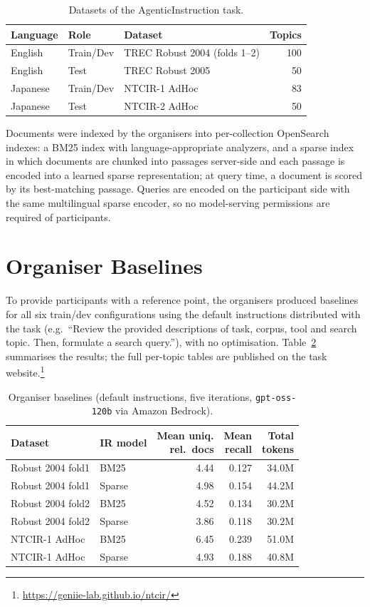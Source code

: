 \documentclass[sigconf,article]{acmart}
\begin{document}
\begin{table}
\caption{Datasets of the AgenticInstruction task.}
\label{tab:datasets}
\begin{tabular}{@{}lllr@{}}
\toprule
Language & Role & Dataset & Topics \\
\midrule
English & Train/Dev & TREC Robust 2004 (folds 1--2) & 100 \\
English & Test & TREC Robust 2005 & 50 \\
Japanese & Train/Dev & NTCIR-1 AdHoc & 83 \\
Japanese & Test & NTCIR-2 AdHoc & 50 \\
\bottomrule
\end{tabular}
\end{table}

Documents were indexed by the organisers into per-collection OpenSearch
indexes: a BM25 index with language-appropriate analyzers, and a sparse
index in which documents are chunked into passages server-side and each
passage is encoded into a learned sparse representation; at query time, a
document is scored by its best-matching passage. Queries are encoded on the
participant side with the same multilingual sparse encoder, so no
model-serving permissions are required of participants.

\section{Organiser Baselines}
\label{sec:baselines}

To provide participants with a reference point, the organisers produced
baselines for all six train/dev configurations using the default
instructions distributed with the task (e.g.\ ``Review the provided
descriptions of task, corpus, tool and search topic. Then, formulate a search
query.''), with no optimisation. Table~\ref{tab:baselines} summarises the
results; the full per-topic tables are published on the task
website.\footnote{\url{https://geniie-lab.github.io/ntcir/}}

\begin{table}
\caption{Organiser baselines (default instructions, five iterations,
\texttt{gpt-oss-120b} via Amazon Bedrock).}
\label{tab:baselines}
\begin{tabular}{@{}llrrr@{}}
\toprule
Dataset & IR model & \makecell[r]{Mean uniq.\\rel.\ docs} & \makecell[r]{Mean\\recall} & \makecell[r]{Total\\tokens} \\
\midrule
Robust 2004 fold1 & BM25 & 4.44 & 0.127 & 34.0M \\
Robust 2004 fold1 & Sparse & 4.98 & 0.154 & 44.2M \\
Robust 2004 fold2 & BM25 & 4.52 & 0.134 & 30.2M \\
Robust 2004 fold2 & Sparse & 3.86 & 0.118 & 30.2M \\
NTCIR-1 AdHoc & BM25 & 6.45 & 0.239 & 51.0M \\
NTCIR-1 AdHoc & Sparse & 4.93 & 0.188 & 40.8M \\
\bottomrule
\end{tabular}
\end{table}
\end{document}
